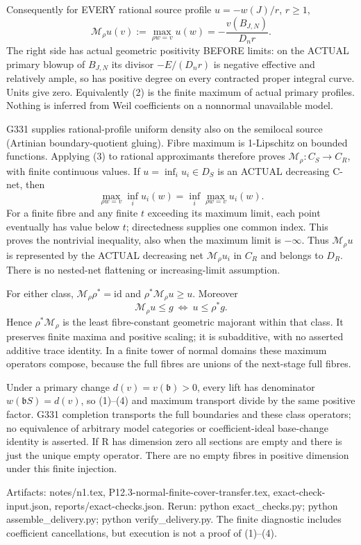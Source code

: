 Consequently for EVERY rational source profile $u=-w(J)/r$, $r\ge1$,
\[
 \mathcal M_\rho u(v):=\max_{\rho w=v}u(w)
             =-\frac{v(B_{J,N})}{D_n r}.                    \tag{3}
\]
The right side has actual geometric positivity BEFORE limits: on the
ACTUAL primary blowup of $B_{J,N}$ its divisor $-E/(D_nr)$ is negative
effective and relatively ample, so has positive degree on every contracted
proper integral curve. Units give zero. Equivalently (2) is the finite
maximum of actual primary profiles. Nothing is inferred from Weil
coefficients on a nonnormal unavailable model.

G331 supplies rational-profile uniform density also on the semilocal
source (Artinian boundary-quotient gluing). Fibre maximum is 1-Lipschitz
on bounded functions. Applying (3) to rational approximants therefore
proves $\mathcal M_\rho:C_S\to C_R$, with finite continuous values.
If $u=\inf_i u_i\in D_S$ is an ACTUAL decreasing C-net, then
\[
 \max_{\rho w=v}\inf_i u_i(w)
       =\inf_i\max_{\rho w=v}u_i(w).                         \tag{4}
\]
For a finite fibre and any finite $t$ exceeding its maximum limit, each
point eventually has value below $t$; directedness supplies one common
index. This proves the nontrivial inequality, also when the maximum
limit is $-\infty$. Thus $\mathcal M_\rho u$ is represented by the
ACTUAL decreasing net $\mathcal M_\rho u_i$ in $C_R$ and belongs to $D_R$.
There is no nested-net flattening or increasing-limit assumption.

For either class, $\mathcal M_\rho\rho^*=\mathrm{id}$ and
$\rho^*\mathcal M_\rho u\ge u$. Moreover
\[
 \mathcal M_\rho u\le g\ \Longleftrightarrow\ u\le\rho^*g.
\]
Hence $\rho^*\mathcal M_\rho$ is the least fibre-constant geometric
majorant within that class. It preserves finite maxima and positive
scaling; it is subadditive, with no asserted additive trace identity.
In a finite tower of normal domains these maximum operators compose,
because the full fibres are unions of the next-stage full fibres.

Under a primary change $d(v)=v(\mathfrak b)>0$, every lift has denominator
$w(\mathfrak bS)=d(v)$, so (1)--(4) and maximum transport divide by the
same positive factor. G331 completion transports the full boundaries and
these class operators; no equivalence of arbitrary model categories or
coefficient-ideal base-change identity is asserted. If R has dimension
zero all sections are empty and there is just the unique empty operator.
There are no empty fibres in positive dimension under this finite injection.

Artifacts: notes/n1.tex, P12.3-normal-finite-cover-transfer.tex,
exact-check-input.json, reports/exact-checks.json. Rerun:
python exact\_checks.py; python assemble\_delivery.py;
python verify\_delivery.py. The finite diagnostic includes coefficient
cancellations, but execution is not a proof of (1)--(4).
